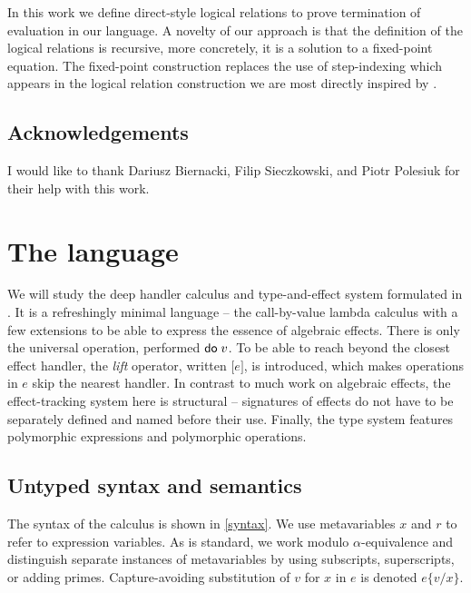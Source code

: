 \documentclass[a4paper, 11pt,titlepage, openright, twoside]{report}
\newcommand{\keyword}[1]{\textsf{\textup{#1}}}
\newcommand{\KwDo}{\keyword{do}}
\newcommand{\Do}{\KwDo\;}
\newcommand{\Lift}[1]{\boldsymbol{[}#1\boldsymbol{]}}
\newcommand{\subst}[2]{\{#1/#2\}}
\newcommand{\+}{\enspace}
\begin{document}
In this work we define direct-style logical relations
to prove termination
of evaluation in our language.
A novelty of our approach
is that the definition of the logical relations
is recursive, more concretely, it is a solution to a fixed-point equation.
The fixed-point construction replaces the use of step-indexing
which appears in the logical relation construction we are most directly inspired by \cite{hwc}.

\section{Acknowledgements}
I would like to thank Dariusz Biernacki, Filip Sieczkowski, and Piotr Polesiuk
for their help with this work.

\chapter{The language}\label{chap:language}
We will study the deep handler calculus and type-and-effect system formulated
in \cite{fscd19}.
It is a refreshingly minimal language – the call-by-value lambda calculus with a few extensions
to be able to express the essence of algebraic effects.
There is only the universal operation, performed $\Do v$.
To be able to reach beyond the closest effect handler,
the \textit{lift} operator, written $\Lift{e}$, is introduced,
which makes operations in $e$ skip the nearest handler.
In contrast to much work on algebraic effects, the effect-tracking system here is structural –
signatures of effects do not have to be separately defined and named before their use.
Finally, the type system features polymorphic expressions and polymorphic operations.

\section{Untyped syntax and semantics}

The syntax of the calculus is shown in \cref{syntax}.
We use metavariables $x$ and $r$ to refer to expression variables.
As is standard, we work modulo $α$-equivalence and distinguish separate instances
of metavariables by using subscripts, superscripts, or adding primes.
Capture-avoiding substitution of $v$ for $x$ in $e$ is denoted $e\subst{v}{x}$.
\end{document}
